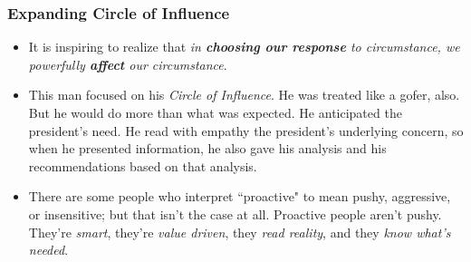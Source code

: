 \documentclass[11pt]{article}
\begin{document}
\subsubsection{Expanding Circle of Influence}
\begin{itemize}
\item It is inspiring to realize that \emph{in \textbf{choosing our response} to circumstance, we powerfully \textbf{affect} our circumstance}. 

\item This man focused on his \emph{Circle of Influence}. He was treated like a gofer, also. But he would do more than what was expected. He anticipated the president's need. He read with empathy the president's underlying concern, so when he presented information, he also gave his analysis and his recommendations based on that analysis.

\item There are some people who interpret ``proactive" to mean pushy, aggressive, or insensitive; but that isn't the case at all. Proactive people aren't pushy. They're \emph{smart}, they're \emph{value driven}, they \emph{read reality}, and they \emph{know what's needed}.
\end{itemize}
\end{document}
